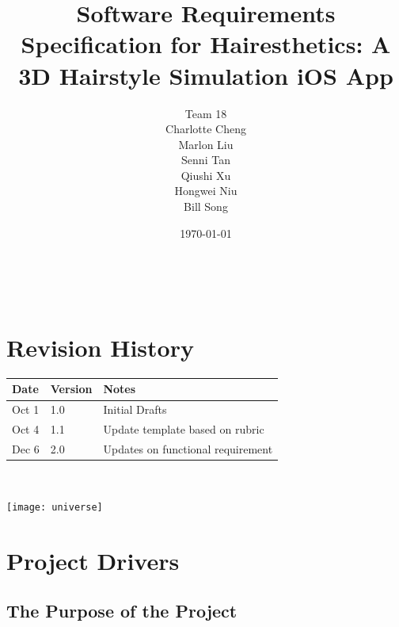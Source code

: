 \documentclass[12pt]{article}
\begin{document}
\title{Software Requirements Specification for Hairesthetics: A 3D Hairstyle Simulation iOS App} 

\author{Team 18 \\ Charlotte Cheng
        \\ Marlon Liu
        \\ Senni Tan
        \\ Qiushi Xu
        \\ Hongwei Niu
        \\ Bill Song
}

\date{\today}
	
\maketitle

~\newpage


\tableofcontents
\listoftables
\listoffigures

\section*{Revision History}

\begin{tabularx}{\textwidth}{p{3cm}p{2cm}X}
\toprule {\bf Date} & {\bf Version} & {\bf Notes}\\
\midrule
Oct 1 & 1.0 & Initial Drafts\\
Oct 4 & 1.1 & Update template based on rubric\\
Dec 6 & 2.0 & Updates on functional requirement
\bottomrule
\end{tabularx}

~\newpage

  

\texttt{[image: universe]}

\section{Project Drivers}

\subsection{The Purpose of the Project}
  
\end{document}
